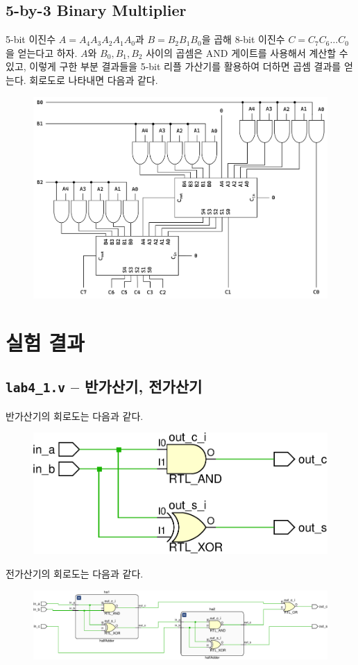 \documentclass{scrartcl}
\begin{document}
\subsection{5-by-3 Binary Multiplier}
5-bit 이진수 \(A = A_4 A_3 A_2 A_1 A_0\)과 \(B = B_2 B_1 B_0\)을 곱해 8-bit 이진수 \(C = C_7 C_6 \dots C_0\)을 얻는다고 하자.
\(A\)와 \(B_0, B_1, B_2\) 사이의 곱셈은 AND 게이트를 사용해서 계산할 수 있고, 이렇게 구한 부분 결과들을 5-bit 리플 가산기를 활용하여 더하면 곱셈 결과를 얻는다.
회로도로 나타내면 다음과 같다.
\begin{figure}[H]
  \centering
  \includegraphics[width=0.9\linewidth]{multiplier.png}
\end{figure}

\section{실험 결과}
\subsection{\texttt{lab4\_1.v} -- 반가산기, 전가산기}
반가산기의 회로도는 다음과 같다.
\begin{figure}[H]
  \centering
  \includegraphics[width=0.9\linewidth]{lab4_1_half_schematic-crop.pdf}
\end{figure}
전가산기의 회로도는 다음과 같다.
\begin{figure}[H]
  \centering
  \includegraphics[width=0.9\linewidth]{lab4_1_full_schematic-crop.pdf}
\end{figure}
\end{document}
